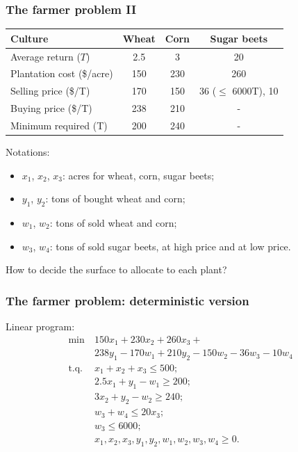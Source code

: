 \documentclass{beamer}
\begin{document}
\begin{frame}
\frametitle{The farmer problem II}

\begin{center}
\begin{tabular}{lccc}
\hline
Culture & Wheat & Corn & Sugar beets \\
\hline
Average return ($T$) & 2.5 & 3 & 20 \\
Plantation cost (\$/acre) & 150 & 230 & 260 \\
Selling price (\$/T) & 170 & 150 & 36 ($\leq$ 6000T), 10 \\
Buying price (\$/T) & 238 & 210 & - \\
Minimum required (T) & 200 & 240 & - \\
\hline
\end{tabular}
\end{center}

\mbox{}

Notations:
\begin{itemize}
\item
$x_1$, $x_2$, $x_3$: acres for wheat, corn, sugar beets;
\item
$y_1$, $y_2$: tons of bought wheat and corn;
\item
$w_1$, $w_2$: tons of sold wheat and corn;
\item
$w_3$, $w_4$: tons of sold sugar beets, at high price and at low price.
\end{itemize}

\mbox{}

How to decide the surface to allocate to each plant?

\end{frame}

\begin{frame}
\frametitle{The farmer problem: deterministic version}

Linear program:
\begin{align*}
\min\ & 150x_1 + 230x_2 + 260x_3 +\\
&  238y_1 - 170w_1 + 210y_2 - 150w_2 -36w_3 - 10w_4 \\
\text{t.q. } & x_1 + x_2 + x_3 \leq 500; \\
& 2.5x_1 + y_1 - w_1 \geq 200; \\
& 3x_2 + y_2 - w_2 \geq 240; \\
& w_3 + w_4 \leq 20 x_3; \\
& w_3 \leq 6000; \\
& x_1, x_2, x_3, y_1, y_2, w_1, w_2, w_3, w_4 \geq 0.
\end{align*}

\end{frame}
\end{document}
